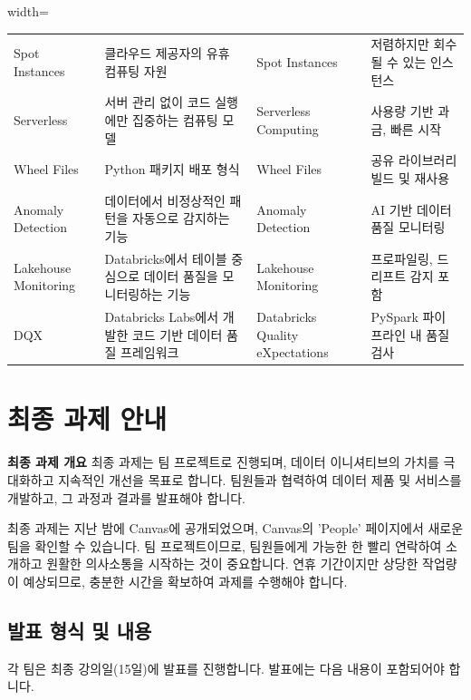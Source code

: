 \documentclass[11pt,a4paper]{article}
\begin{document}
\begin{table}[h!]
\begin{adjustbox}{width=\textwidth}
\begin{tabular}{llll}
Spot Instances & 클라우드 제공자의 유휴 컴퓨팅 자원 & Spot Instances & 저렴하지만 회수될 수 있는 인스턴스 \\
Serverless & 서버 관리 없이 코드 실행에만 집중하는 컴퓨팅 모델 & Serverless Computing & 사용량 기반 과금, 빠른 시작 \\
Wheel Files & Python 패키지 배포 형식 & Wheel Files & 공유 라이브러리 빌드 및 재사용 \\
Anomaly Detection & 데이터에서 비정상적인 패턴을 자동으로 감지하는 기능 & Anomaly Detection & AI 기반 데이터 품질 모니터링 \\
Lakehouse Monitoring & Databricks에서 테이블 중심으로 데이터 품질을 모니터링하는 기능 & Lakehouse Monitoring & 프로파일링, 드리프트 감지 포함 \\
DQX & Databricks Labs에서 개발한 코드 기반 데이터 품질 프레임워크 & Databricks Quality eXpectations & PySpark 파이프라인 내 품질 검사 \\
\bottomrule
\end{tabular}
\end{adjustbox}
\end{table}

\newpage
\section{최종 과제 안내}

\begin{conceptbox}
\textbf{최종 과제 개요}
최종 과제는 팀 프로젝트로 진행되며, 데이터 이니셔티브의 가치를 극대화하고 지속적인 개선을 목표로 합니다. 팀원들과 협력하여 데이터 제품 및 서비스를 개발하고, 그 과정과 결과를 발표해야 합니다.
\end{conceptbox}

최종 과제는 지난 밤에 Canvas에 공개되었으며, Canvas의 'People' 페이지에서 새로운 팀을 확인할 수 있습니다. 팀 프로젝트이므로, 팀원들에게 가능한 한 빨리 연락하여 소개하고 원활한 의사소통을 시작하는 것이 중요합니다. 연휴 기간이지만 상당한 작업량이 예상되므로, 충분한 시간을 확보하여 과제를 수행해야 합니다.

\subsection{발표 형식 및 내용}
각 팀은 최종 강의일(15일)에 발표를 진행합니다. 발표에는 다음 내용이 포함되어야 합니다.
\end{document}
